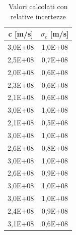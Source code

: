 \documentclass{article}
\begin{document}
            \begin{table}[H]

                \begin{minipage}{0.35\linewidth}

                    \centering
                    \begin{tabular}{ c c } 

                        \toprule
                        c [m/s] &  $\sigma_c$ [m/s] \\ 

                        \midrule
                        3,0E+08	&    1,0E+08 \\
                        2,5E+08	&    0,7E+08 \\
                        2,0E+08	&    0,6E+08 \\
                        2,3E+08	&    0,6E+08 \\
                        2,1E+08	&    0,6E+08 \\
                        3,0E+08	&    1,0E+08 \\
                        2,1E+08	&    0,5E+08 \\
                        3,0E+08	&    1,0E+08 \\
                        2,6E+08	&    0,8E+08 \\
                        3,0E+08	&    1,0E+08 \\
                        2,6E+08	&    0,9E+08 \\
                        3,0E+08	&    1,0E+08 \\
                        3,0E+08	&    1,0E+08 \\
                        2,4E+08	&    0,9E+08 \\
                        3,1E+08	&    0,6E+08 \\
                        \bottomrule 

                    \end{tabular}
                    \caption{Valori calcolati con relative incertezze}
    
                \end{minipage}
                \begin{minipage}{0.65\linewidth}


\end{minipage}
\end{table}
\end{document}
